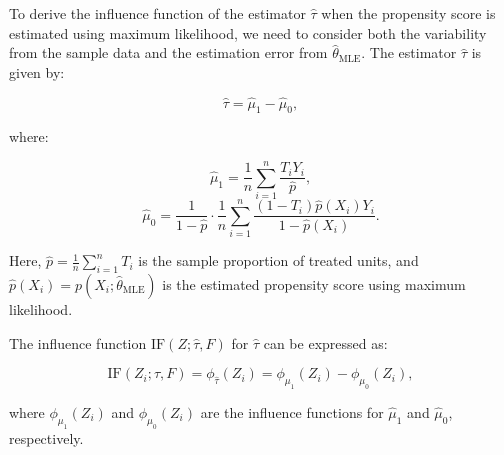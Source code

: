 \documentclass{article}
\begin{document}
To derive the influence function of the estimator \( \hat{\tau} \) when the propensity score is estimated using maximum likelihood, we need to consider both the variability from the sample data and the estimation error from \( \hat{\theta}_{\text{MLE}} \). The estimator \( \hat{\tau} \) is given by:

\[
\hat{\tau} = \hat{\mu}_1 - \hat{\mu}_0,
\]

where:

\[
\hat{\mu}_1 = \frac{1}{n} \sum_{i=1}^n \frac{T_i Y_i}{\hat{p}},
\]
\[
\hat{\mu}_0 = \frac{1}{1 - \hat{p}} \cdot \frac{1}{n} \sum_{i=1}^n \frac{(1 - T_i) \hat{p}(X_i) Y_i}{1 - \hat{p}(X_i)}.
\]

Here, \( \hat{p} = \frac{1}{n} \sum_{i=1}^n T_i \) is the sample proportion of treated units, and \( \hat{p}(X_i) = p(X_i; \hat{\theta}_{\text{MLE}}) \) is the estimated propensity score using maximum likelihood.

The influence function \( \text{IF}(Z; \hat{\tau}, F) \) for \( \hat{\tau} \) can be expressed as:

\[
\text{IF}(Z_i; \hat{\tau}, F) = \phi_{\hat{\tau}}(Z_i) = \phi_{\mu_1}(Z_i) - \phi_{\mu_0}(Z_i),
\]

where \( \phi_{\mu_1}(Z_i) \) and \( \phi_{\mu_0}(Z_i) \) are the influence functions for \( \hat{\mu}_1 \) and \( \hat{\mu}_0 \), respectively.
\end{document}
